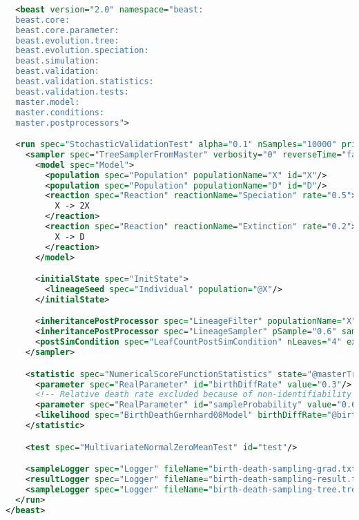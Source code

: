 \documentclass[oneside]{article}
\begin{document}
{\small
\singlespacing
\begin{lstlisting}[language=XML, caption=BEAST 2 control file for
  generating two distributions under the Yule model (one obtained by
  sampling through MCMC and the other with direct simulation)., label={lst:sf}]
  
  <beast version="2.0" namespace="beast:
  beast.core:
  beast.core.parameter:
  beast.evolution.tree:
  beast.evolution.speciation:
  beast.simulation:
  beast.validation:
  beast.validation.statistics:
  beast.validation.tests:
  master.model:
  master.conditions:
  master.postprocessors">

  <run spec="StochasticValidationTest" alpha="0.1" nSamples="10000" printEvery="1000">
    <sampler spec="TreeSamplerFromMaster" verbosity="0" reverseTime="false" simulationTime="3.0" id="masterTree">
      <model spec="Model">
        <population spec="Population" populationName="X" id="X"/>
        <population spec="Population" populationName="D" id="D"/>
        <reaction spec="Reaction" reactionName="Speciation" rate="0.5">
          X -> 2X
        </reaction>
        <reaction spec="Reaction" reactionName="Extinction" rate="0.2">
          X -> D
        </reaction>
      </model>

      <initialState spec="InitState">
        <lineageSeed spec="Individual" population="@X"/>
      </initialState>

      <inheritancePostProcessor spec="LineageFilter" populationName="X"/>
      <inheritancePostProcessor spec="LineageSampler" pSample="0.6" samplingTime="3.0"/>
      <postSimCondition spec="LeafCountPostSimCondition" nLeaves="4" exact="true" />
    </sampler>

    <statistic spec="NumericalScoreFunctionStatistics" state="@masterTree" id="grad">
      <parameter spec="RealParameter" id="birthDiffRate" value="0.3"/>
      <!-- Relative death rate excluded because of non-identifiability -->
      <parameter spec="RealParameter" id="sampleProbability" value="0.6"/>
      <likelihood spec="BirthDeathGernhard08Model" birthDiffRate="@birthDiffRate" relativeDeathRate="0.4" sampleProbability="@sampleProbability" originHeight="3.0" tree="@masterTree" />
    </statistic>

    <test spec="MultivariateNormalZeroMeanTest" id="test"/>

    <sampleLogger spec="Logger" fileName="birth-death-sampling-grad.txt" log="@grad"/>
    <resultLogger spec="Logger" fileName="birth-death-sampling-result.txt" log="@test"/>
    <sampleLogger spec="Logger" fileName="birth-death-sampling-tree.trees" log="@masterTree"/>
  </run>
</beast>
\end{lstlisting}
}
\end{document}
